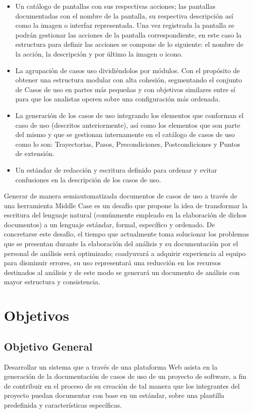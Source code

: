 \begin{itemize}
	\item Un catálogo de pantallas con sus respectivas acciones; las pantallas documentadas con el nombre de la pantalla, su respectiva descripción así como la imagen o interfaz representada. Una vez registrada la pantalla se podrán gestionar las acciones de la pantalla correspondiente, en este caso la estructura para definir las acciones se compone de lo siguiente: el nombre de la acción, la descripción y por último la imagen o icono.
	\item La agrupación de casos uso dividiéndolos por módulos. Con el propósito de obtener una estructura modular con alta cohesión, segmentando el conjunto de Casos de uso en partes más pequeñas y con objetivos similares entre sí para que los analistas operen sobre una configuración más ordenada.
	\item La generación de los casos de uso integrando los elementos que conforman el caso de uso (descritos anteriormente), así como los elementos que son parte del mismo y que se gestionan internamente en el catálogo de casos de uso como lo son: Trayectorias, Pasos, Precondiciones, Postcondiciones y Puntos de extensión.
	\item Un estándar de redacción y escritura definido para ordenar y evitar confusiones en la descripción de los casos de uso.
\end{itemize}
	
Generar de manera semiautomatizada documentos de casos de uso a través de una herramienta Middle Case es un desafío que propone la idea de transformar la escritura del lenguaje natural (comúnmente empleado en la elaboración de dichos documentos) a un lenguaje estándar, formal, específico y ordenado. De concretarse este desafío, el tiempo que actualmente toma solucionar los problemas que se presentan durante la elaboración del análisis y su documentación por el personal de análisis será optimizado; coadyuvará a adquirir experiencia al equipo para disminuir errores, su uso representará una reducción en los recursos destinados al análisis y de este modo se generará un documento de análisis con mayor estructura y consistencia.

\section{Objetivos}
\subsection{Objetivo General}
Desarrollar un sistema que a través de una plataforma Web asista en la generación de la documentación de casos de uso de un proyecto de software, a fin de contribuir en el proceso de su creación de tal manera que los integrantes del proyecto puedan documentar con base en un estándar, sobre una plantilla predefinida y características específicas.

